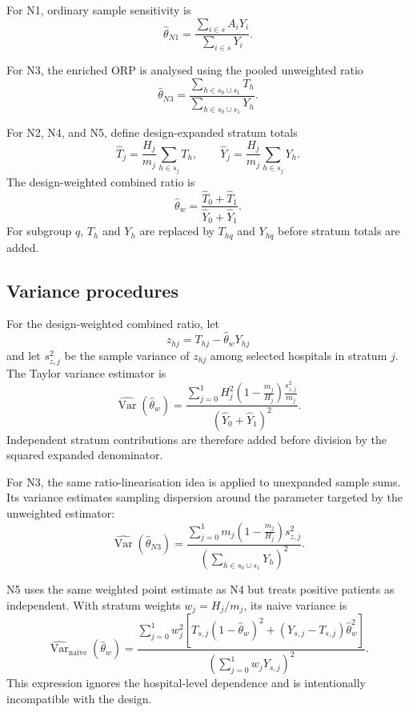 For N1, ordinary sample sensitivity is
\[
  \widehat\theta_{N1}
  =
  \frac{\sum_{i\in s}A_iY_i}{\sum_{i\in s}Y_i}.
\]

For N3, the enriched ORP is analysed using the pooled unweighted ratio
\[
  \widehat\theta_{N3}
  =
  \frac{\sum_{h\in s_0\cup s_1}T_h}
       {\sum_{h\in s_0\cup s_1}Y_h}.
\]

For N2, N4, and N5, define design-expanded stratum totals
\[
  \widehat T_j
  =
  \frac{H_j}{m_j}\sum_{h\in s_j}T_h,
  \qquad
  \widehat Y_j
  =
  \frac{H_j}{m_j}\sum_{h\in s_j}Y_h.
\]
The design-weighted combined ratio is
\[
  \widehat\theta_w
  =
  \frac{\widehat T_0+\widehat T_1}
       {\widehat Y_0+\widehat Y_1}.
\]
For subgroup \(q\), \(T_h\) and \(Y_h\) are replaced by
\(T_{hq}\) and \(Y_{hq}\) before stratum totals are added.

\subsection{Variance procedures}

For the design-weighted combined ratio, let
\[
  z_{hj}=T_{hj}-\widehat\theta_wY_{hj}
\]
and let \(s_{z,j}^2\) be the sample variance of \(z_{hj}\) among selected
hospitals in stratum \(j\). The Taylor variance estimator is
\begin{equation}
  \widehat{\operatorname{Var}}(\widehat\theta_w)
  =
  \frac{
    \sum_{j=0}^1
    H_j^2\left(1-\frac{m_j}{H_j}\right)
    \frac{s_{z,j}^2}{m_j}
  }{
    (\widehat Y_0+\widehat Y_1)^2
  }.
  \label{eq:nav-app-taylor}
\end{equation}
Independent stratum contributions are therefore added before division by the
squared expanded denominator.

For N3, the same ratio-linearisation idea is applied to unexpanded sample
sums. Its variance estimates sampling dispersion around the parameter targeted
by the unweighted estimator:
\[
  \widehat{\operatorname{Var}}(\widehat\theta_{N3})
  =
  \frac{
    \sum_{j=0}^1
    m_j\left(1-\frac{m_j}{H_j}\right)s_{z,j}^2
  }{
    \left(\sum_{h\in s_0\cup s_1}Y_h\right)^2
  }.
\]

N5 uses the same weighted point estimate as N4 but treats positive patients as
independent. With stratum weights \(w_j=H_j/m_j\), its naive variance is
\[
  \widehat{\operatorname{Var}}_{\mathrm{naive}}(\widehat\theta_w)
  =
  \frac{
    \sum_{j=0}^1 w_j^2
    \left[
      T_{s,j}(1-\widehat\theta_w)^2
      +(Y_{s,j}-T_{s,j})\widehat\theta_w^2
    \right]
  }{
    \left(\sum_{j=0}^1w_jY_{s,j}\right)^2
  }.
\]
This expression ignores the hospital-level dependence and is intentionally
incompatible with the design.

